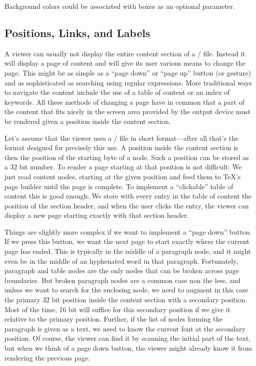Background colors could be associated with boxes as an optional parameter.

\subsection{Positions, Links, and Labels}
A viewer can usually not display the entire content section of
a \HINT/ file. Instead it will display a page of content and will give
its user various means to change the page. This might be as simple as
a ``page down'' or ``page up'' button (or gesture) and as
sophisticated as searching using regular expressions.  More
traditional ways to navigate the content include the use of a table of
content or an index of keywords. All these methods of changing a page
have in common that a part of the content that fits nicely in the
screen area provided by the output device must be rendered given a
position inside the content section.


Let's assume that the viewer uses a \HINT/ file in short
format---after all that's the format designed for precisely this use.
A position inside the content section is then the position of the
starting byte of a node. Such a position can be stored as a 32 bit
number.  To render a page starting at that position is not difficult:
We just read content nodes, starting at the given position and feed
them to \TeX's page builder until the page is complete. To implement a
``clickable'' table of content this is good enough. We store with
every entry in the table of content the position of the section
header, and when the user clicks the entry, the viewer can display a
new page starting exactly with that section header.

Things are slightly more complex if we want to implement a ``page
down'' button. If we press this button, we want the next page to
start exactly where the current page has ended.  This is
typically in the middle of a paragraph node, and it might even be in
the middle of an hyphenated word in that paragraph. Fortunately,
paragraph and table nodes are the only nodes that can be broken across page
boundaries. But broken paragraph nodes are a common case non the less,
and unless we want to search for the enclosing node, we need to
augment in this case the primary 32 bit position inside the content
section with a secondary position. Most of the
time, 16 bit will suffice for this secondary position if we give it
relative to the primary position. Further, if the list of nodes forming the
paragraph is given as a text, we need to know the current font at the
secondary position. Of course, the viewer can find it by scanning the
initial part of the text, but when we think of a page down button, the
viewer might already know it from rendering the previous page.

